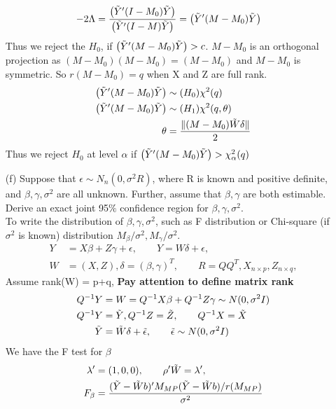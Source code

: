 \documentclass{article}
\begin{document}
\begin{itemize}
\begin{align*}
-2 \Lambda &= \frac{\left(\Tilde{Y}' (I- M_0) \Tilde{Y} \right)}{\left(\Tilde{Y}' (I- M) \Tilde{Y} \right)} = \left(\Tilde{Y}' (M -M_0) \Tilde{Y} \right)
\end{align*}
Thus we reject the $H_0$, if $\left(\Tilde{Y}' (M -M_0) \Tilde{Y} \right) > c$.
$M-M_0$ is an orthogonal projection as $(M-M_0)(M-M_0) = (M-M_0)$ and $M-M_0$ is symmetric. So $r(M-M_0) = q$ when X and Z are full rank.\\
\begin{align*}
\left(\Tilde{Y}' (M -M_0) \Tilde{Y} \right) &\sim (H_0) \chi^2(q)\\
\left(\Tilde{Y}' (M -M_0) \Tilde{Y} \right) &\sim (H_1) \chi^2(q, \theta)\\
\theta &= \frac{\lVert (M-M_0) \Tilde{W} \delta \rVert}{2}
\end{align*}
Thus we reject $H_0$ at level $\alpha$ if $\left(\Tilde{Y}' (M -M_0) \Tilde{Y} \right) > \chi^2_{\alpha}(q)$
\item[(f)] Suppose that $\epsilon \sim N_n(0, \sigma^2 R )$, where R is known and positive definite, and
$\beta, \gamma, \sigma^2$ are all unknown. Further, assume that $\beta, \gamma$ are both estimable. Derive an exact joint 95$\%$ confidence region for $\beta, \gamma, \sigma^2$.\\
To write the distribution of $\beta, \gamma, \sigma^2$, such as F distribution or Chi-square (if $\sigma^2$ is known) distribution $M_{\beta}/ \sigma^2, M_{\gamma}/ \sigma^2$.
\begin{align*}
Y &= X\beta + Z\gamma + \epsilon, \qquad Y = W\delta + \epsilon, \\
W &= (X, Z), \delta = (\beta, \gamma)^T, \qquad R = Q Q^{T}, X_{n \times p}, Z_{n \times q}, 
\end{align*}
Assume rank(W) = p+q, \textbf{Pay attention to define matrix rank}
\begin{align*}
Q^{-1}Y &= W = Q^{-1}X \beta + Q^{-1}Z \gamma \sim N(0, \sigma^2 I)\\
Q^{-1}Y &= \Tilde{Y}, Q^{-1}Z = \Tilde{Z}, \qquad Q^{-1}X = \Tilde{X}\\
\Tilde{Y} &= \Tilde{W} \delta + \Tilde{\epsilon},  \qquad \Tilde{\epsilon} \sim N(0,\sigma^2 I)
\end{align*}
We have the F test for $\beta$  
\begin{align*}
\lambda' &= (1,0,0), \qquad \rho'\Tilde{W} = \lambda', \\
F_{\beta} &= \frac{(\Tilde{Y}- \Tilde{W} b)'M_{MP} (\Tilde{Y}- \Tilde{W} b)/r(M_{MP})}{\sigma^2}\\

\end{align*}
\end{itemize}
\end{document}
